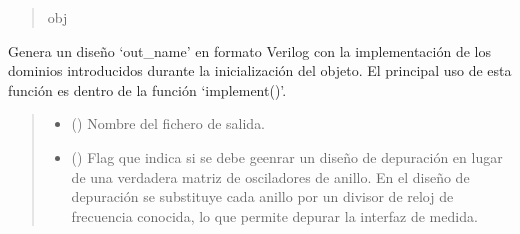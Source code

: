 \documentclass[letterpaper,10pt,english]{sphinxmanual}
\begin{document}
\begin{fulllineitems}
\begin{fulllineitems}
\begin{quote}
\begin{description}
\sphinxAtStartPar
obj

\end{description}\end{quote}

\end{fulllineitems}


\begin{fulllineitems}
\label{\detokenize{fpga.ring_osc:fpga.ring_osc.StdMatrix.gen_romatrix}}
\pysigstartsignatures
{}
\pysigstopsignatures
\sphinxAtStartPar
Genera un diseño ‘out\_name’ en formato Verilog con la implementación de
los dominios introducidos durante la inicialización del objeto. El
principal uso de esta función es dentro de la función ‘implement()’.
\begin{quote}\begin{description}
\begin{itemize}
\item {} 
\sphinxAtStartPar
{} (\sphinxstyleliteralemphasis{\sphinxupquote{, }}) \textendash{} Nombre del fichero de salida.

\item {} 
\sphinxAtStartPar
{} (\sphinxstyleliteralemphasis{\sphinxupquote{, }}) \textendash{} Flag que indica si se debe geenrar un diseño de depuración en lugar de una verdadera matriz de osciladores de anillo. En el diseño de depuración se substituye cada anillo por un divisor de reloj de frecuencia conocida, lo que permite depurar la interfaz de medida.

\end{itemize}

\end{description}\end{quote}

\end{fulllineitems}


\end{fulllineitems}
\end{document}
